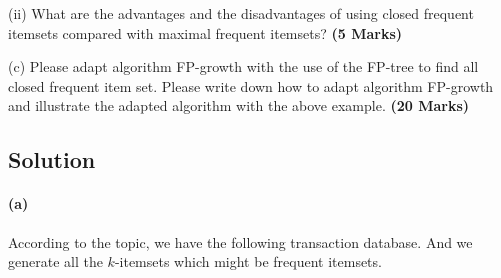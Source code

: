 \documentclass[en,black,normal,10pt]{elegantnote}
\begin{document}
(ii) What are the advantages and the disadvantages of using closed frequent itemsets compared with maximal frequent itemsets? \textbf{(5 Marks)}

(c) Please adapt algorithm FP-growth with the use of the FP-tree to find all closed frequent item set.
Please write down how to adapt algorithm FP-growth and illustrate the adapted algorithm with the above example. \textbf{(20 Marks)}

\subsection*{Solution}

\paragraph*{(a)} According to the topic, we have the following transaction database. And we generate all the $k$-itemsets which might be frequent itemsets.
\end{document}
